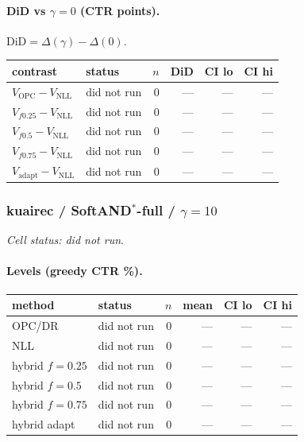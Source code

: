 \documentclass[10pt,a4paper]{article}
\begin{document}
\paragraph{DiD vs $\gamma=0$ (CTR points).} $\mathrm{DiD}=\Delta(\gamma)-\Delta(0)$.
{\centering\small\begin{tabular}{llrrrr}
\toprule contrast & status & $n$ & DiD & CI lo & CI hi \\
\midrule
$V_{\mathrm{OPC}}-V_{\mathrm{NLL}}$ & did not run & 0 & --- & --- & --- \\
$V_{f0.25}-V_{\mathrm{NLL}}$ & did not run & 0 & --- & --- & --- \\
$V_{f0.5}-V_{\mathrm{NLL}}$ & did not run & 0 & --- & --- & --- \\
$V_{f0.75}-V_{\mathrm{NLL}}$ & did not run & 0 & --- & --- & --- \\
$V_{\mathrm{adapt}}-V_{\mathrm{NLL}}$ & did not run & 0 & --- & --- & --- \\
\bottomrule\end{tabular}\par}
\bigskip
\subsubsection{kuairec / SoftAND$^*$-full / $\gamma=10$}
\emph{Cell status: did not run}.
\paragraph{Levels (greedy CTR \%).}
{\centering\small\begin{tabular}{llrrrr}
\toprule method & status & $n$ & mean & CI lo & CI hi \\
\midrule
OPC/DR & did not run & 0 & --- & --- & --- \\
NLL & did not run & 0 & --- & --- & --- \\
hybrid $f{=}0.25$ & did not run & 0 & --- & --- & --- \\
hybrid $f{=}0.5$ & did not run & 0 & --- & --- & --- \\
hybrid $f{=}0.75$ & did not run & 0 & --- & --- & --- \\
hybrid adapt & did not run & 0 & --- & --- & --- \\
\bottomrule\end{tabular}\par}
\end{document}
